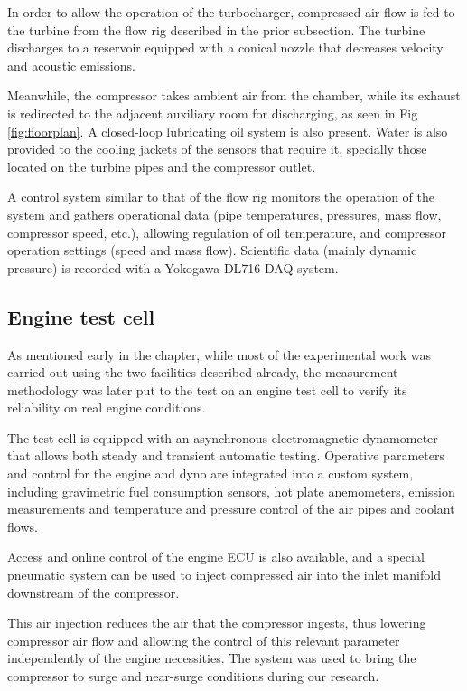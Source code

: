 In order to allow the operation of the turbocharger, compressed air flow is fed to the turbine from the flow rig described in the prior subsection. The turbine discharges to a reservoir equipped with a conical nozzle that decreases velocity and acoustic emissions.

Meanwhile, the compressor takes ambient air from the chamber, while its exhaust is redirected to the adjacent auxiliary room for discharging, as seen in Fig \ref{fig:floorplan}. A closed-loop lubricating oil system is also present. Water is also provided to the cooling jackets of the sensors that require it, specially those located on the turbine pipes and the compressor outlet.

A control system similar to that of the flow rig monitors the operation of the system and gathers operational data (pipe temperatures, pressures, mass flow, compressor speed, etc.), allowing regulation of oil temperature, and compressor operation settings (speed and mass flow). Scientific data (mainly dynamic pressure) is recorded with a Yokogawa DL716 DAQ system.

\subsection{Engine test cell} \label{sub:engine_cell}

As mentioned early in the chapter, while most of the experimental work was carried out using the two facilities described already, the measurement methodology was later put to the test on an engine test cell to verify its reliability on real engine conditions.

The test cell is equipped with an asynchronous electromagnetic dynamometer that allows both steady and transient automatic testing. Operative parameters and control for the engine and dyno are integrated into a custom system, including gravimetric fuel consumption sensors, hot plate anemometers, emission measurements and temperature and pressure control of the air pipes and coolant flows.

Access and online control of the engine ECU is also available, and a special pneumatic system can be used to inject compressed air into the inlet manifold downstream of the compressor.

This air injection reduces the air that the compressor ingests, thus lowering compressor air flow and allowing the control of this relevant parameter independently of the engine necessities. The system was used to bring the compressor to surge and near-surge conditions during our research.

